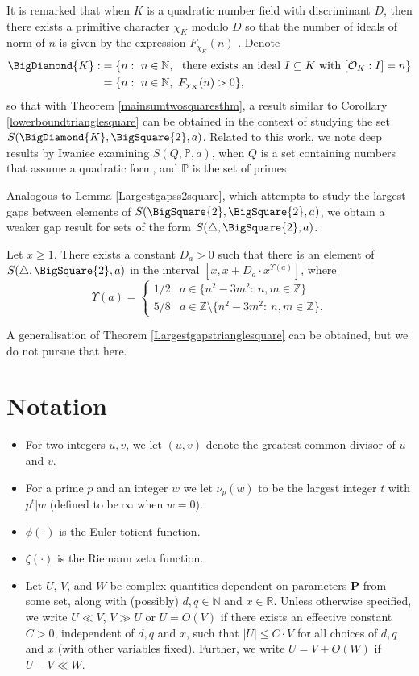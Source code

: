 \documentclass[12pt]{amsart}
\newcommand{\1}{\mathmybb{1}}
\begin{document}
It is remarked that when $K$ is a quadratic number field with discriminant $D$, then there exists a primitive character $\chi_{K}$ modulo $D$ so that the number of ideals of norm of $n$ is given by the expression $F_{\chi_{K}}(n)$ \cite{Muller}. Denote
\begin{align*}
\BigDiamond{K}:&= \{n: \ n\in \mathbb{N}, \ \text{ there exists an ideal }I\subseteq K\text{ with }[\mathcal{O}_{K}:I]=n\}\\
&= \{n: \ n\in \mathbb{N}, \ F_{\chi_{K}}(n)>0\},
\end{align*}
so that with Theorem \ref{mainsumtwosquaresthm}, a result similar to Corollary \ref{lowerboundtrianglesquare} can be obtained in the context of studying the set $S(\BigDiamond{K},\BigSquare{2},a)$. Related to this work, we note deep results by Iwaniec \cite[Thm. 1]{Iwaniec} examining $S(Q,\mathbb{P},a)$, when $Q$ is a set containing numbers that assume a quadratic form, and $\mathbb{P}$ is the set of primes.

Analogous to Lemma \ref{Largestgapss2square}, which attempts to study the largest gaps between elements of $S(\BigSquare{2},\BigSquare{2},a)$, we obtain a weaker gap result for sets of the form $S(\triangle, \BigSquare{2},a)$.
\begin{thm}
\label{Largestgapstrianglesquare}
Let $x \geq 1$. There exists a constant $D_{a}>0$ such that there is an element of $S(\triangle, \BigSquare{2},a)$ in the interval $[x, x + D_{a}\cdot x^{\Upsilon(a)}]$, where
\[
\Upsilon(a) = \begin{cases}
                1/2 & a \in \{n^2-3m^2: \ n,m \in \mathbb{Z}\}\\
                5/8 & a \in \mathbb{Z}\setminus\{n^2-3m^2: \ n,m \in \mathbb{Z}\}.
            \end{cases}
\]
\end{thm}
A generalisation of Theorem \ref{Largestgapstrianglesquare} can be obtained, but we do not pursue that here.
\section{Notation}
\begin{itemize}
\item For two integers $u,v$, we let $(u,v)$ denote the greatest common divisor of $u$ and $v$.
\item For a prime $p$ and an integer $w$ we let $\nu_{p}(w)$ to be the largest integer $t$ with $p^{t}|w$ (defined to be $\infty$ when $w = 0$).
\item $\phi(\cdot)$ is the Euler totient function.
\item $\zeta(\cdot)$ is the Riemann zeta function.
\item Let $U$, $V$, and $W$ be complex quantities dependent on parameters $\mathbf{P}$ from some set, along with (possibly) $d,q \in \mathbb{N}$ and $x \in \mathbb{R}$. Unless otherwise specified, we write $U \ll V$, $V \gg U$ or $U = O(V)$ if there exists an effective constant $C > 0$, independent of $d,q$ and $x$, such that $|U| \leq C\cdot V$ for all choices of $d,q$ and $x$ (with other variables fixed). Further, we write $U = V+O(W)$ if $U-V \ll W$.
\end{itemize}
\end{document}
